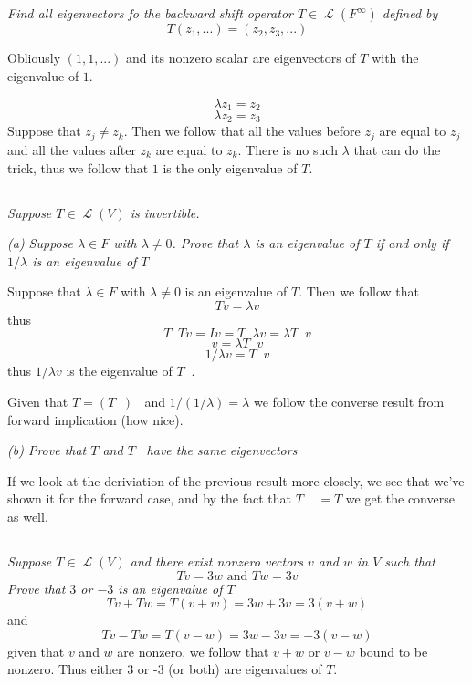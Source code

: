 \documentclass[11pt,oneside,titlepage]{book}
\DeclareMathOperator \map {\mathcal {L}}
\DeclareMathOperator \inv {^{-1}}
\begin{document}
\subsection{}

\textit{Find all eigenvectors fo the backward shift operator $T \in \map(F^\infty)$ defined by}
$$T(z_1, ...) = (z_2, z_3, ...)$$

Obliously $(1, 1, ...)$ and its nonzero scalar are eigenvectors of $T$ with the eigenvalue
of $1$.

$$\lambda z_1 = z_2$$
$$\lambda z_2 = z_3$$
Suppose that $z_j \neq z_k$. Then we follow that all the values before $z_j$ are equal to $z_j$
and all the values after $z_k$ are equal to $z_k$. There is no such $\lambda$ that can do
the trick, thus we follow that $1$ is the only eigenvalue of $T$.

\subsection{}

\textit{Suppose $T \in \map(V)$ is invertible.}

\textit{(a) Suppose $\lambda \in F$ with $\lambda \neq 0$. Prove that $\lambda$ is an eigenvalue
  of $T$ if and only if $1/\lambda$ is an eigenvalue of $T \inv$}

Suppose that $\lambda \in F$ with $\lambda \neq 0$ is an eigenvalue of $T$. Then we follow that
$$Tv = \lambda v$$
thus
$$T \inv T v = I v = T \inv \lambda v =  \lambda T \inv v$$
$$v = \lambda T \inv v$$
$$1/\lambda v = T \inv v$$
thus $1/\lambda v$ is the eigenvalue of $T \inv$.

Given that $T = (T \inv)\inv$ and $1/(1/\lambda) = \lambda$ we follow the converse result from
forward implication (how nice).

\textit{(b) Prove that $T$ and $T \inv $ have the same eigenvectors}

If we look at the deriviation of the previous result more closely, we see that we've shown
it for the forward case, and by the fact that $T \inv \inv  = T$ we get the converse as well.


\subsection{}

\textit{Suppose $T \in \map(V)$ and there exist nonzero vectors $v$ and $w$ in $V$ such that }
$$Tv = 3w \text{ and } Tw = 3v$$
\textit{Prove that $3$ or $-3$ is an eigenvalue of $T$}
$$Tv + Tw = T(v + w) = 3w + 3v = 3(v + w)$$
and
$$Tv - Tw = T(v - w) = 3w - 3v = -3(v - w)$$
given that $v$ and $w$ are nonzero, we follow that $v + w$ or $v - w$ bound to be nonzero.
Thus either 3 or -3 (or both) are eigenvalues of $T$.
\end{document}
